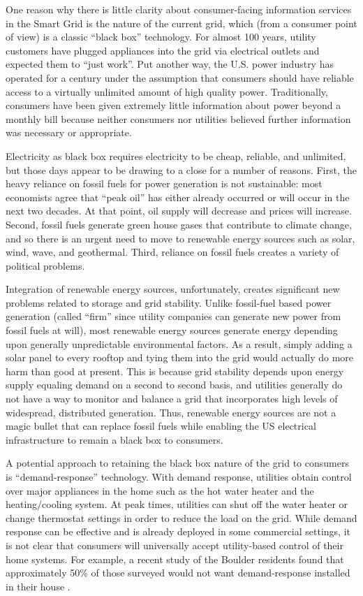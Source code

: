 One reason why there is little clarity about consumer-facing information
services in the Smart Grid is the nature of the current grid, which (from a
consumer point of view) is a classic ``black box'' technology.  For almost
100 years, utility customers have plugged appliances into the grid via
electrical outlets and expected them to ``just work''.  Put another way,
the U.S. power industry has operated for a century under the assumption
that consumers should have reliable access to a virtually unlimited amount
of high quality power.  Traditionally, consumers have been given extremely
little information about power beyond a monthly bill because neither
consumers nor utilities believed further information was necessary or
appropriate.

Electricity as black box requires electricity to be cheap, reliable, and
unlimited, but those days appear to be drawing to a close for a number of
reasons.  First, the heavy reliance on fossil fuels for power generation is
not sustainable: most economists agree that ``peak oil'' has either already
occurred or will occur in the next two decades. At that point, oil supply
will decrease and prices will increase.  Second, fossil fuels generate
green house gases that contribute to climate change, and so there is an
urgent need to move to renewable energy sources such as solar, wind, wave,
and geothermal.  Third, reliance on fossil fuels creates a variety of
political problems.

Integration of renewable energy sources, unfortunately, creates significant
new problems related to storage and grid stability.  Unlike fossil-fuel
based power generation (called ``firm'' since utility companies can
generate new power from fossil fuels at will), most renewable energy
sources generate energy depending upon generally unpredictable
environmental factors.  As a result, simply adding a solar panel to every
rooftop and tying them into the grid would actually do more harm than good
at present.  This is because grid stability depends upon energy supply
equaling demand on a second to second basis, and utilities generally do not
have a way to monitor and balance a grid that incorporates high levels of
widespread, distributed generation. Thus, renewable energy sources are not
a magic bullet that can replace fossil fuels while enabling the US
electrical infrastructure to remain a black box to consumers.

A potential approach to retaining the black box nature of the grid to
consumers is ``demand-response'' technology.  With demand response,
utilities obtain control over major appliances in the home such as the hot
water heater and the heating/cooling system. At peak times, utilities can
shut off the water heater or change thermostat settings in order to reduce
the load on the grid.  While demand response can be effective and is
already deployed in some commercial settings, it is not clear that
consumers will universally accept utility-based control of their home
systems.  For example, a recent study of the Boulder residents found that
approximately 50\% of those surveyed would not want demand-response
installed in their house \cite{Farhar09}.

